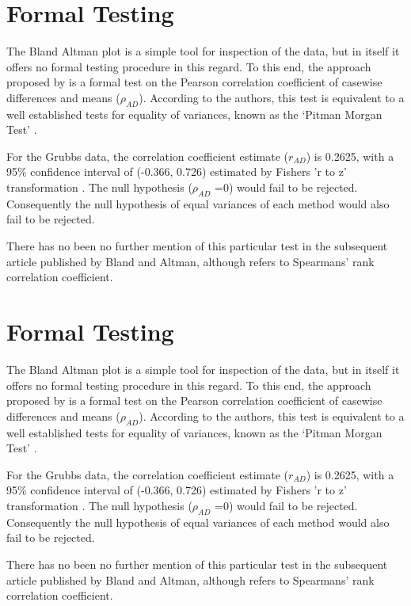\documentclass[12pt, a4paper]{report}
\theoremstyle{plain}
\theoremstyle{definition}
\theoremstyle{remark}
\begin{document}
	
	
	\section{Formal Testing}
	The Bland Altman plot is a simple tool for inspection of the data,
	but in itself it offers no formal testing procedure in this
	regard. To this end, the approach proposed by \citet{BA83} is a
	formal test on the Pearson correlation coefficient  of casewise
	differences and means ($\rho_{AD}$). According to the authors,
	this test is equivalent to a well established tests for equality
	of variances, known as the `Pitman Morgan Test' \citep{Pitman,
		Morgan}.
	
	For the Grubbs data, the correlation coefficient estimate
	($r_{AD}$) is 0.2625, with a 95\% confidence interval of (-0.366,
	0.726) estimated by Fishers 'r to z' transformation \citep{Cohen}.
	The null hypothesis ($\rho_{AD}$ =0) would fail to be rejected.
	Consequently the null hypothesis of equal variances of each method
	would also fail to be rejected.
	
	There has no been no further mention of this particular test in
	the subsequent article published by Bland and Altman, although
	\citet{BA99} refers to Spearmans' rank correlation coefficient.
	
	
	\newpage
	\section{Formal Testing}
	The Bland Altman plot is a simple tool for inspection of the data,
	but in itself it offers no formal testing procedure in this
	regard. To this end, the approach proposed by \citet{BA83} is a
	formal test on the Pearson correlation coefficient  of casewise
	differences and means ($\rho_{AD}$). According to the authors,
	this test is equivalent to a well established tests for equality
	of variances, known as the `Pitman Morgan Test' \citep{Pitman,
		Morgan}.
	
	For the Grubbs data, the correlation coefficient estimate
	($r_{AD}$) is 0.2625, with a 95\% confidence interval of (-0.366,
	0.726) estimated by Fishers 'r to z' transformation \citep{Cohen}.
	The null hypothesis ($\rho_{AD}$ =0) would fail to be rejected.
	Consequently the null hypothesis of equal variances of each method
	would also fail to be rejected.
	
	There has no been no further mention of this particular test in
	the subsequent article published by Bland and Altman, although
	\citet{BA99} refers to Spearmans' rank correlation coefficient.
	
\end{document}
